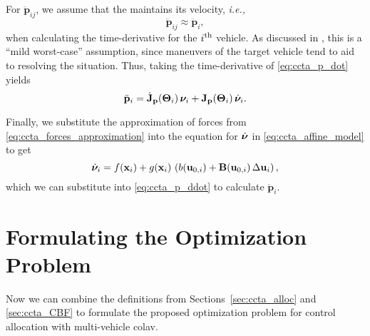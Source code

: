 \noindent For $\ddot{\mathbf{p}}_{ij}$, we assume that the  maintains its velocity, \emph{i.e.,}
\begin{equation}
    \ddot{\mathbf{p}}_{ij} \approx \ddot{\mathbf{p}}_{i},
\end{equation}
when calculating the time-derivative for the $i^{\rm th}$ vehicle.
As discussed in \cite{thyri_reactive_2020}, this is a ``mild worst-case'' assumption, since maneuvers of the target vehicle tend to aid to resolving the situation.
Thus, taking the time-derivative of \eqref{eq:ccta_p_dot} yields
\begin{equation}
    \ddot{\mathbf{p}}_{i} = \dot{\mathbf{J}}_{\mathbf{p}}(\bm{\Theta}_{i}) \, \bm{\nu}_{i} + \mathbf{J}_{\mathbf{p}}(\bm{\Theta}_{i}) \, \dot{\bm{\nu}}_{i}.
    \label{eq:ccta_p_ddot}
\end{equation}

Finally, we substitute the approximation of forces from \eqref{eq:ccta_forces_approximation} into the equation for $\dot{\bm{\nu}}$ in \eqref{eq:ccta_affine_model} to get
\begin{equation}
    \dot{\bm{\nu}}_{i} = f(\mathbf{x}_{i}) + g(\mathbf{x}_{i})\,\left(b(\mathbf{u}_{0,i}) + \mathbf{B}(\mathbf{u}_{0,i})\,\Delta\mathbf{u}_{i}\right),
\end{equation}
which we can substitute into \eqref{eq:ccta_p_ddot} to calculate $\ddot{\mathbf{p}}_{i}$.

\section{Formulating the Optimization Problem}
\label{sec:ccta_optimization}
Now we can combine the definitions from Sections~\ref{sec:ccta_alloc} and \ref{sec:ccta_CBF} to formulate the proposed optimization problem for control allocation with multi-vehicle \gls{colav}.


